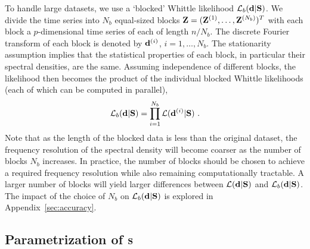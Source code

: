 \documentclass[%
 reprint,
 amsmath,amssymb,
 aps,
]{revtex4-2}
\begin{document}
To handle large datasets, we use a `blocked' Whittle likelihood $\mathcal{L}_b(\d|\S)$. We divide the time series into $N_{b}$ equal-sized blocks $\Z=(\Z^{(1)},\ldots,\Z^{(N_{b})})^T$ with each block a $p$-dimensional time series of each of length $n/N_{b}$. The discrete Fourier transform of each block is denoted by 
$\d^{(i)}$, $i=1,\ldots,N_{b}$. The stationarity assumption implies that the statistical properties of each block, in particular their spectral densities, are the same.
Assuming independence of different blocks, 
the likelihood then becomes the product of the individual blocked Whittle likelihoods (each of which can be computed in parallel), 
\begin{equation}\label{eq: likelihood network time}
    \mathcal{L}_b(\d|\S) = \prod^{N_b}_{i=1} \mathcal{L}(\d^{(i)}|\S) \ .
\end{equation}
Note that as the length of the blocked data is less than the original dataset, %
the frequency resolution of the spectral density will become coarser as the number of blocks $N_b$ increases. In practice, the number of blocks should be chosen to achieve a required frequency resolution while also remaining computationally tractable. A larger number of blocks will yield larger 
 differences between $\mathcal{L}(\d|\S)$ and $\mathcal{L}_b(\d|\S)$. 
The impact of the choice of $N_b$ on $\mathcal{L}_b(\d|\S)$ is explored in Appendix~\ref{sec:accuracy}. 


\subsection{Parametrization of $\S$}
\end{document}
